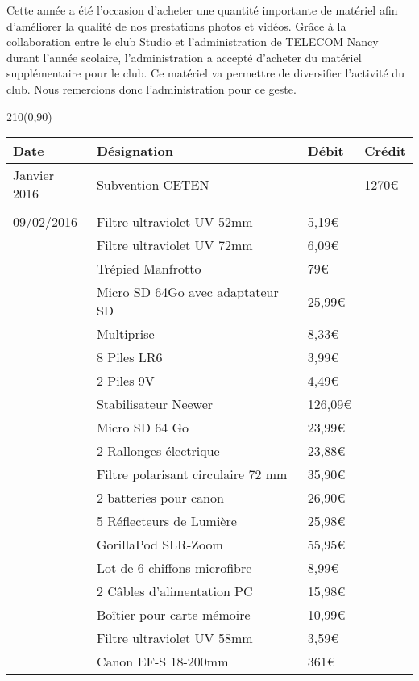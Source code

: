 Cette année a été l'occasion d'acheter une quantité importante de matériel afin d'améliorer la qualité de nos prestations photos et vidéos.
Grâce à la collaboration entre le club Studio et l'administration de TELECOM Nancy durant l'année scolaire, l'administration a accepté d'acheter du matériel supplémentaire pour le club. Ce matériel va permettre de diversifier l'activité du club. Nous remercions donc l'administration pour ce geste.

\begin{textblock}{210}(0,90)
\begin{center}
	\begin{tabular}{|p{3cm}|p{8cm}|p{2cm}|p{2cm}|}
		\hline
			\textbf{Date} & \textbf{Désignation} & \textbf{Débit} & \textbf{Crédit}\\
		\hline
	    Janvier 2016 & Subvention CETEN & & 1270\euro{}\\

	    & & & \\

	    09/02/2016 & Filtre ultraviolet UV 52mm & 5,19\euro{} & \\
	    & Filtre ultraviolet UV 72mm & 6,09\euro{} & \\
		& Trépied Manfrotto & 79\euro{} & \\
		& Micro SD 64Go avec adaptateur SD & 25,99\euro{} & \\
		& Multiprise & 8,33\euro{} & \\
		& 8 Piles LR6 & 3,99\euro{} & \\
		& 2 Piles 9V & 4,49\euro{} & \\
		& Stabilisateur Neewer & 126,09\euro{} & \\
		& Micro SD 64 Go & 23,99\euro{} & \\
		& 2 Rallonges électrique & 23,88\euro{} &\\
		& Filtre polarisant circulaire 72 mm & 35,90\euro{} & \\
		& 2 batteries pour canon & 26,90\euro{} & \\
		& 5 Réflecteurs de Lumière & 25,98\euro{} & \\
		& GorillaPod SLR-Zoom & 55,95\euro{} & \\
		& Lot de 6 chiffons microfibre & 8,99\euro{} & \\
		& 2 Câbles d'alimentation PC & 15,98\euro{} & \\
		& Boîtier pour carte mémoire & 10,99\euro{} & \\
		& Filtre ultraviolet UV 58mm & 3,59\euro{} & \\
		& Canon EF-S 18-200mm & 361\euro{} & \\


\end{tabular}
\end{center}
\end{textblock}
